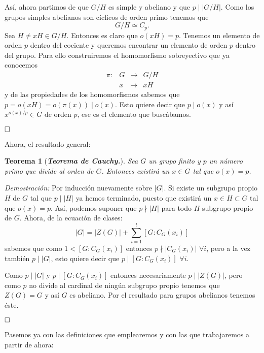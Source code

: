 \documentclass[12pt]{article}
\newtheorem{theorem}{Teorema}[section]
\begin{document}
Así, ahora partimos de que $G/H$ es simple y abeliano y que  $p \mid |G/H|$. Como los grupos simples abelianos son cíclicos de orden primo tenemos que $$G/H \simeq C_{p}.$$ Sea $H \neq xH \in G/H$. Entonces es claro que $o(xH) = p$. Tenemos un elemento de orden $p$ dentro del cociente y queremos encontrar un elemento de orden $p$ dentro del grupo. Para ello construiremos el homomorfismo sobreyectivo que ya conocemos $$\begin{array}{rccl}
\pi \colon &G & \longrightarrow & G/H\\
&x & \longmapsto &xH
\end{array}
$$ y de las propiedades de los homomorfismos sabemos que $p = o(xH) = o(\pi(x)) \mid o(x)$. Esto quiere decir que $p \mid o(x)$ y así $x^{o(x)/p} \in G$ de orden $p$, ese es el elemento que buscábamos.

$\hfill \square$

Ahora, el resultado general:

\begin{theorem}[\textbf{\textit{Teorema de Cauchy.}}]
Sea $G$ un grupo finito y $p$ un número primo que divide al orden de $G$. Entonces existirá un $x \in G$ tal que $o(x) = p$.
\end{theorem}
\emph{Demostración: } Por inducción nuevamente sobre $|G|$. Si existe un subgrupo propio $H$ de $G$ tal que $p \mid |H|$ ya hemos terminado, puesto que existirá un $x \in H \subset G$ tal que $o(x) = p$. Así, podemos suponer que $p \nmid |H|$ para todo $H$ subgrupo propio de $G$. Ahora, de la ecuación de clases: $$|G| = |Z(G)| + \sum_{i = 1}^{t}  \left[ G:C_{G}(x_{i}) \right]$$ sabemos que como $1 <  \left[ G:C_{G}(x_{i}) \right]$ entonces $p \nmid |C_{G}(x_{i})|$ $\forall i$, pero a la vez también $p \mid |G|$, esto quiere decir que $p \mid  \left[ G:C_{G}(x_{i}) \right]$ $\forall i$.

Como $p \mid |G|$ y $p \mid  \left[ G:C_{G}(x_{i}) \right]$ entonces necesariamente $p \mid |Z(G)|$, pero como $p$ no divide al cardinal de ningún subgrupo propio tenemos que $Z(G) = G$ y así $G$ es abeliano. Por el resultado para grupos abelianos tenemos éste.

$\hfill \square$

Pasemos ya con las definiciones que emplearemos y con las que trabajaremos a partir de ahora:
\end{document}

